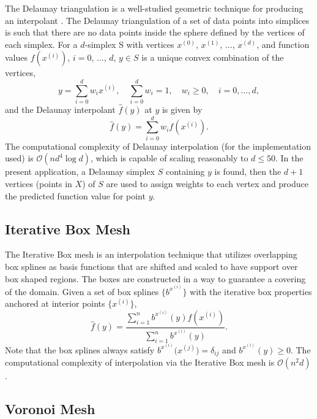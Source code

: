 \documentclass[smallextended]{svjour3}       %
\begin{document}
The Delaunay triangulation is a well-studied geometric technique for producing an interpolant \cite{lee1980two}. The Delaunay triangulation of a set of data points into simplices is such that there are no data points inside the sphere defined by the vertices of each simplex. For a $d$-simplex S with vertices $x^{(0)}$, $x^{(1)}$, $\ldots$, $x^{(d)}$, and function values $f(x^{(i)})$, $i=0$, $\ldots$, $d$, $y \in S$ is a unique convex combination of the vertices,
$$ y = \sum_{i=0}^{d} w_i x^{(i)}, \quad \sum_{i=0}^{d} w_i = 1, \quad w_i \geq 0, \quad i=0,\ldots,d, $$
and the Delaunay interpolant $\hat f(y)$ at $y$ is given by
$$ \hat f(y) = \sum_{i=0}^{d} w_i f(x^{(i)}). $$
The computational complexity of Delaunay interpolation (for the implementation used) is $\mathcal{O}(n d^4 \log d)$, which is capable of scaling reasonably to $d \leq 50$. In the present application, a Delaunay simplex $S$ containing $y$ is found, then the $d+1$ vertices (points in $X$) of $S$ are used to assign weights to each vertex and produce the predicted function value for point $y$.

\subsection{Iterative Box Mesh}
\label{sec:max_box_mesh}

The Iterative Box mesh is an interpolation technique that utilizes overlapping box splines \cite{de2013box} as basis functions that are shifted and scaled to have support over box shaped regions. The boxes are constructed in a way to guarantee a covering of the domain. Given a set of box splines $\bigl\{b^{x^{(i)}}\bigr\}$ with the iterative box properties anchored at interior points $\bigl\{x^{(i)}\bigr\}$,
$$ \hat f(y) = \frac{\sum\limits_{i=1}^n b^{x^{(i)}}(y) f(x^{(i)})}{\sum\limits_{i=1}^n b^{x^{(i)}}(y)}. $$
Note that the box splines always satisfy $b^{x^{(i)}}\bigl(x^{(j)}\bigr) = \delta_{ij}$ and $b^{x^{(i)}}(y) \geq 0$. The computational complexity of interpolation via the Iterative Box mesh is $\mathcal{O}(n^2 d)$.

\subsection{Voronoi Mesh}
\label{sec:voronoi_mesh}
\end{document}
